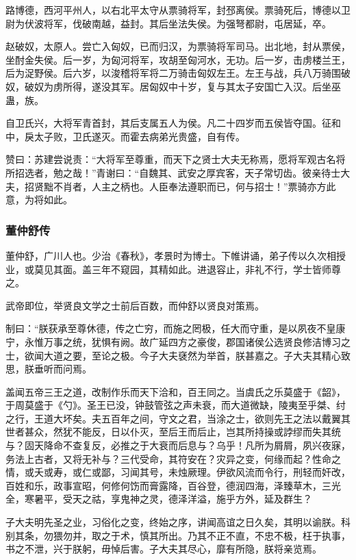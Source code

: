 \documentclass[]{article}
\begin{document}
路博德，西河平州人，以右北平太守从票骑将军，封邳离侯。票骑死后，博德以卫尉为伏波将军，伐破南越，益封。其后坐法失侯。为强弩都尉，屯居延，卒。

赵破奴，太原人。尝亡入匈奴，已而归汉，为票骑将军司马。出北地，封从票侯，坐酎金失侯。后一岁，为匈河将军，攻胡至匈河水，无功。后一岁，击虏楼兰王，后为浞野侯。后六岁，以浚稽将军将二万骑击匈奴左王。左王与战，兵八万骑围破奴，破奴为虏所得，遂没其军。居匈奴中十岁，复与其太子安国亡入汉。后坐巫蛊，族。

自卫氏兴，大将军青首封，其后支属五人为侯。凡二十四岁而五侯皆夺国。征和中，戾太子败，卫氏遂灭。而霍去病弟光贵盛，自有传。

赞曰：苏建尝说责：``大将军至尊重，而天下之贤士大夫无称焉，愿将军观古名将所招选者，勉之哉！''青谢曰：``自魏其、武安之厚宾客，天子常切齿。彼亲待士大夫，招贤黜不肖者，人主之柄也。人臣奉法遵职而已，何与招士！''票骑亦方此意，为将如此。

\hypertarget{header-n4490}{%
\subsubsection{董仲舒传}\label{header-n4490}}

董仲舒，广川人也。少治《春秋》，孝景时为博士。下帷讲诵，弟子传以久次相授业，或莫见其面。盖三年不窥园，其精如此。进退容止，非礼不行，学士皆师尊之。

武帝即位，举贤良文学之士前后百数，而仲舒以贤良对策焉。

制曰：``朕获承至尊休德，传之亡穷，而施之罔极，任大而守重，是以夙夜不皇康宁，永惟万事之统，犹惧有阙。故广延四方之豪俊，郡国诸侯公选贤良修洁博习之士，欲闻大道之要，至论之极。今子大夫褎然为举首，朕甚嘉之。子大夫其精心致思，朕垂听而问焉。

盖闻五帝三王之道，改制作乐而天下洽和，百王同之。当虞氏之乐莫盛于《韶》，于周莫盛于《勺》。圣王已没，钟鼓管弦之声未衰，而大道微缺，陵夷至乎桀、纣之行，王道大坏矣。夫五百年之间，守文之君，当涂之士，欲则先王之法以戴翼其世者甚众，然犹不能反，日以仆灭，至后王而后止，岂其所持操或誖缪而失其统与？固天降命不查复反，必推之于大衰而后息与？乌乎！凡所为屑屑，夙兴夜寐，务法上古者，又将无补与？三代受命，其符安在？灾异之变，何缘而起？性命之情，或夭或寿，或仁或鄙，习闻其号，未烛厥理。伊欲风流而令行，刑轻而奸改，百姓和乐，政事宣昭，何修何饬而膏露降，百谷登，德润四海，泽臻草木，三光全，寒暑平，受天之祜，享鬼神之灵，德泽洋溢，施乎方外，延及群生？

子大夫明先圣之业，习俗化之变，终始之序，讲闻高谊之日久矣，其明以谕朕。科别其条，勿猥勿并，取之于术，慎其所出。乃其不正不直，不忠不极，枉于执事，书之不泄，兴于朕躬，毋悼后害。子大夫其尽心，靡有所隐，朕将亲览焉。
\end{document}
